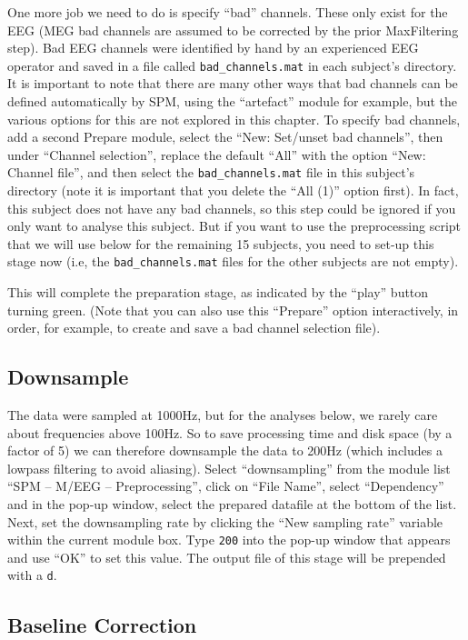 One more job we need to do is specify ``bad'' channels. These only exist for the EEG (MEG bad channels are assumed to be corrected by the prior MaxFiltering step). Bad EEG channels were identified by hand by an experienced EEG operator and saved in a file called \texttt{bad\_channels.mat} in each subject's directory. It is important to note that there are many other ways that bad channels can be defined automatically by SPM, using the ``artefact'' module for example, but the various options for this are not explored in this chapter. To specify bad channels, add a second Prepare module, select the ``New: Set/unset bad channels'', then under ``Channel selection'', replace the default ``All'' with the option ``New: Channel file'', and then select the \texttt{bad\_channels.mat} file in this subject's directory (note it is important that you delete the ``All (1)'' option first). In fact, this subject does not have any bad channels, so this step could be ignored if you only want to analyse this subject. But if you want to use the preprocessing script that we will use below for the remaining 15 subjects, you need to set-up this stage now (i.e, the \texttt{bad\_channels.mat} files for the other subjects are not empty).

This will complete the preparation stage, as indicated by the ``play'' button turning green. (Note that you can also use this ``Prepare'' option interactively, in order, for example, to create and save a bad channel selection file).

\subsection{Downsample}

The data were sampled at 1000Hz, but for the analyses below, we rarely care about frequencies above 100Hz. So to save processing time and disk space (by a factor of 5) we can therefore downsample the data to 200Hz (which includes a lowpass filtering to avoid aliasing). Select ``downsampling'' from the module list ``SPM -- M/EEG -- Preprocessing'', click on ``File Name'', select ``Dependency'' and in the pop-up window, select the prepared datafile at the bottom of the list. Next, set the downsampling rate by clicking the ``New sampling rate'' variable within the current module box. Type \texttt{200} into the pop-up window that appears and use ``OK'' to set this value. The output file of this stage will be prepended with a \texttt{d}. 

\subsection{Baseline Correction}

